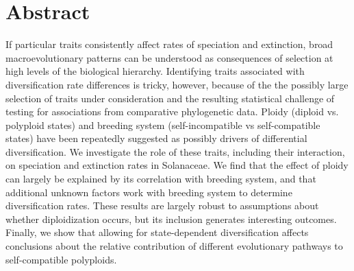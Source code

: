 \section{Abstract}

%
%
If particular traits consistently affect rates of speciation and extinction, broad macroevolutionary patterns can be understood as consequences of selection at high levels of the biological hierarchy.
Identifying traits associated with diversification rate differences is tricky, however, because of the the possibly large selection of traits under consideration and the resulting statistical challenge of testing for associations from comparative phylogenetic data.
Ploidy (diploid vs. polyploid states) and breeding system (self-incompatible vs self-compatible states) have been repeatedly suggested as possibly drivers of differential diversification.
We investigate the role of these traits, including their interaction, on speciation and extinction rates in Solanaceae.
We find that the effect of ploidy can largely be explained by its correlation with breeding system, and that additional unknown factors work with breeding system to determine diversification rates.
These results are largely robust to assumptions about whether diploidization occurs, but its inclusion generates interesting outcomes. %
Finally, we show that allowing for state-dependent diversification affects conclusions about the relative contribution of different evolutionary pathways to self-compatible polyploids.
